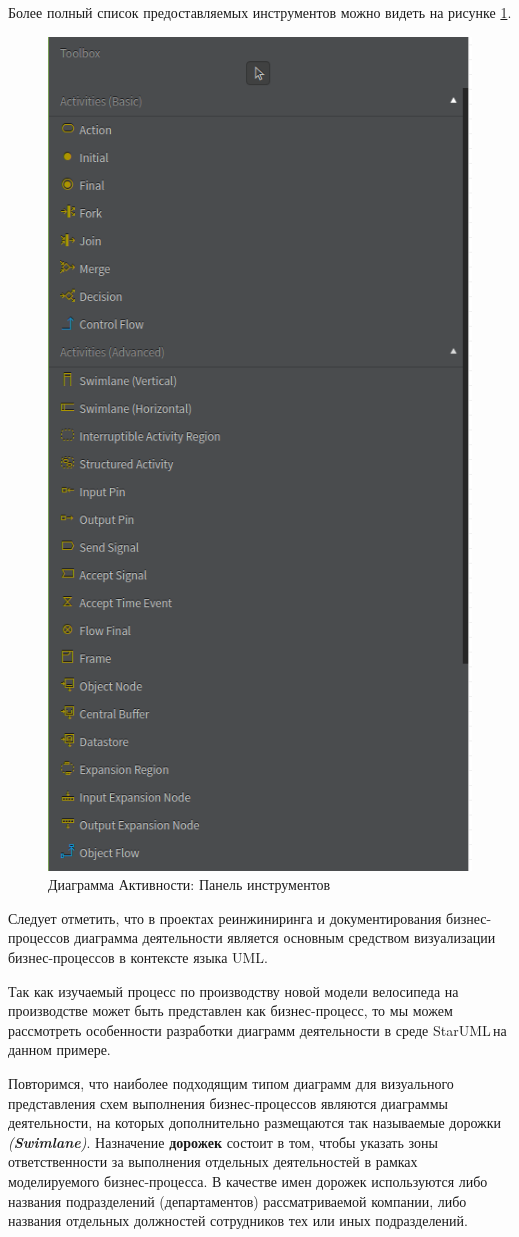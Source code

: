 \documentclass[a4paper,12pt]{report}
\newcommand{\staruml}{StarUML\,\tm}
\begin{document}
Более полный список предоставляемых инструментов можно видеть на рисунке \ref{fig:activitytoolbox}.
\begin{figure}[h!]
	\centering
	\includegraphics[width=0.5\linewidth]{images/activitytoolbox}
	\caption{Диаграмма Активности: Панель инструментов}
	\label{fig:activitytoolbox}
\end{figure}

Следует отметить, что в проектах реинжиниринга и документирования бизнес-процессов диаграмма деятельности является основным средством визуализации бизнес-процессов в контексте языка UML. 

Так как изучаемый процесс по производству новой модели велосипеда на производстве может быть представлен как бизнес-процесс, то мы можем рассмотреть особенности разработки диаграмм деятельности в среде \staruml на данном примере. 

Повторимся, что наиболее подходящим типом диаграмм для визуального представления схем выполнения бизнес-процессов являются диаграммы деятельности, на которых дополнительно размещаются так называемые дорожки \textit{(\textbf{Swimlane})}. Назначение \textbf{дорожек} состоит в том, чтобы указать зоны ответственности за выполнения отдельных деятельностей в рамках моделируемого бизнес-процесса. 
В качестве имен дорожек используются либо названия подразделений (департаментов) рассматриваемой компании, либо названия отдельных должностей сотрудников тех или иных подразделений.
\end{document}
